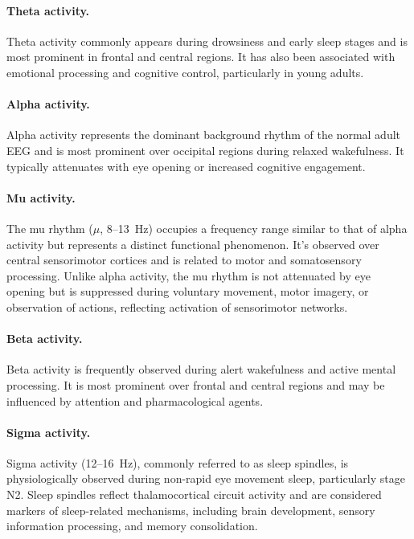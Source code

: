 \paragraph*{Theta activity.}
Theta activity commonly appears during drowsiness and early sleep stages and is most prominent in frontal and central regions. It has also been associated with emotional processing and cognitive control, particularly in young adults.

\paragraph*{Alpha activity.}
Alpha activity represents the dominant background rhythm of the normal adult EEG and is most prominent over occipital regions during relaxed wakefulness. It typically attenuates with eye opening or increased cognitive engagement.

\paragraph*{Mu activity.}
The mu rhythm ($\mu$, 8--13~Hz) occupies a frequency range similar to that of alpha activity but represents a distinct functional phenomenon. It's observed over central sensorimotor cortices and is related to motor and somatosensory processing. Unlike alpha activity, the mu rhythm is not attenuated by eye opening but is suppressed during voluntary movement, motor imagery, or observation of actions, reflecting activation of sensorimotor networks.

\paragraph*{Beta activity.}
Beta activity is frequently observed during alert wakefulness and active mental processing. It is most prominent over frontal and central regions and may be influenced by attention and pharmacological agents.

\paragraph*{Sigma activity.}
Sigma activity (12--16~Hz), commonly referred to as sleep spindles, is physiologically observed during non-rapid eye movement sleep, particularly stage N2. Sleep spindles reflect thalamocortical circuit activity and are considered markers of sleep-related mechanisms, including brain development, sensory information processing, and memory consolidation.

